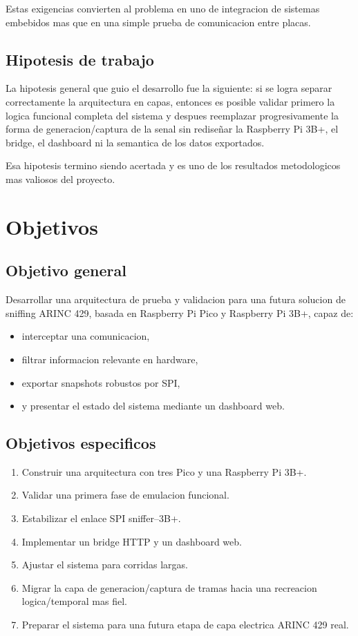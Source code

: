 \documentclass[12pt,a4paper,oneside]{report}
\begin{document}
Estas exigencias convierten al problema en uno de integracion de sistemas embebidos mas que en una simple prueba de comunicacion entre placas.

\section{Hipotesis de trabajo}

La hipotesis general que guio el desarrollo fue la siguiente: si se logra separar correctamente la arquitectura en capas, entonces es posible validar primero la logica funcional completa del sistema y despues reemplazar progresivamente la forma de generacion/captura de la senal sin rediseñar la Raspberry Pi 3B+, el bridge, el dashboard ni la semantica de los datos exportados.

Esa hipotesis termino siendo acertada y es uno de los resultados metodologicos mas valiosos del proyecto.

\chapter{Objetivos}

\section{Objetivo general}

Desarrollar una arquitectura de prueba y validacion para una futura solucion de sniffing ARINC 429, basada en Raspberry Pi Pico y Raspberry Pi 3B+, capaz de:

\begin{itemize}[leftmargin=1.2cm]
    \item interceptar una comunicacion,
    \item filtrar informacion relevante en hardware,
    \item exportar snapshots robustos por SPI,
    \item y presentar el estado del sistema mediante un dashboard web.
\end{itemize}

\section{Objetivos especificos}

\begin{enumerate}[leftmargin=1.2cm]
    \item Construir una arquitectura con tres Pico y una Raspberry Pi 3B+.
    \item Validar una primera fase de emulacion funcional.
    \item Estabilizar el enlace SPI sniffer--3B+.
    \item Implementar un bridge HTTP y un dashboard web.
    \item Ajustar el sistema para corridas largas.
    \item Migrar la capa de generacion/captura de tramas hacia una recreacion logica/temporal mas fiel.
    \item Preparar el sistema para una futura etapa de capa electrica ARINC 429 real.
\end{enumerate}
\end{document}

